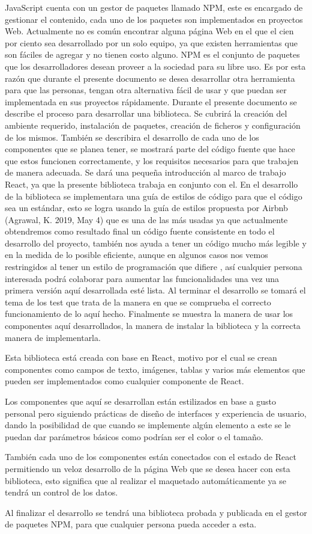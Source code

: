JavaScript cuenta con un gestor de paquetes llamado NPM, este es encargado de gestionar el contenido, cada uno de los paquetes son  implementados en proyectos Web.
Actualmente no es común encontrar alguna página Web en el que el cien por ciento sea desarrollado por un solo equipo, ya que existen herramientas que son fáciles de agregar y no tienen costo alguno.
NPM es el conjunto de paquetes que los desarrolladores desean proveer a la sociedad para su libre uso.
Es por esta razón que durante el presente documento se desea desarrollar otra herramienta para que las personas, tengan otra alternativa fácil de usar y que puedan ser implementada en sus proyectos rápidamente.
Durante el presente documento se describe el proceso para desarrollar una biblioteca. 
Se cubrirá la creación del ambiente requerido, instalación de paquetes, creación de ficheros y configuración de los mismos. 
También se describira el desarrollo de cada uno de los componentes que se planea tener, se mostrará parte del código fuente que hace que estos funcionen correctamente, y los requisitos necesarios para que trabajen de manera adecuada. 
Se dará una pequeña introducción al marco de trabajo React, ya que la presente biblioteca trabaja en conjunto con el.
En el desarrollo de la biblioteca se implementara una guía de estilos de código para que el código sea un estándar, esto se logra usando la guía de estilos propuesta por Airbnb \cite{airbnb} (Agrawal, K. 2019, May 4) que es una de las más usadas ya que actualmente obtendremos como resultado final un código fuente consistente en todo el desarrollo del proyecto, también nos ayuda a tener un código mucho más legible y en la medida de lo posible eficiente, aunque en algunos casos nos vemos restringidos al tener un estilo de programación que difiere , así cualquier persona interesada podrá colaborar para aumentar las funcionalidades una vez una primera versión aquí desarrollada esté lista.
Al terminar el desarrollo se tomará el tema de los test que trata de la manera en que se comprueba el correcto funcionamiento de lo aquí hecho.
Finalmente se muestra la manera de usar los componentes aquí desarrollados, la manera de instalar la biblioteca y la correcta manera de implementarla.

Esta biblioteca está creada con base en React, motivo por el cual se crean componentes como campos de texto, imágenes, tablas y varios más elementos que pueden ser implementados como cualquier componente de React. 

Los componentes que aquí se desarrollan están estilizados en base a gusto personal pero siguiendo prácticas de diseño de interfaces y experiencia de usuario, dando la posibilidad de que cuando se implemente algún elemento a este se le puedan dar parámetros básicos como podrían ser el color o el tamaño.

También cada uno de los componentes están conectados con el estado de React permitiendo un veloz desarrollo de la página Web que se desea hacer con esta biblioteca, esto significa que al realizar el maquetado automáticamente ya se tendrá un control de los datos.

Al finalizar el desarrollo se tendrá una biblioteca probada y publicada en el gestor de paquetes NPM, para que cualquier persona pueda acceder a esta.